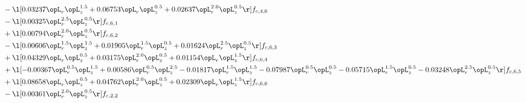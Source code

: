 \begin{alignat}{2}
& - \l[  0.03237 \opL_r \opL_z^{1.5} +  0.06753 \opL_r \opL_z^{0.5} +  0.02637 \opL_r^{2.0} \opL_z^{0.5}  \r] f_{c,4,6} \nonumber \\ 
& - \l[  0.00325 \opL_r^{2.5} \opL_z^{0.5}  \r] f_{c,6,1} \nonumber \\ 
& + \l[  0.00794 \opL_r^{2.0} \opL_z^{0.5}  \r] f_{c,6,2} \nonumber \\ 
& - \l[  0.00606 \opL_r^{1.5} \opL_z^{1.5} +  0.01905 \opL_r^{1.5} \opL_z^{0.5} +  0.01624 \opL_r^{2.5} \opL_z^{0.5}  \r] f_{c,6,3} \nonumber \\ 
& + \l[  0.04329 \opL_r \opL_z^{0.5} +  0.03175 \opL_r^{2.0} \opL_z^{0.5} +  0.01154 \opL_r \opL_z^{1.5}  \r] f_{c,6,4} \nonumber \\ 
& + \l[  -0.00367 \opL_r^{0.5} \opL_z^{1.5} +  0.00586 \opL_r^{0.5} \opL_z^{2.5}   -0.01817 \opL_r^{1.5} \opL_z^{1.5}   -0.07987 \opL_r^{0.5} \opL_z^{0.5}   -0.05715 \opL_r^{1.5} \opL_z^{0.5}   -0.03248 \opL_r^{2.5} \opL_z^{0.5}  \r] f_{c,6,5} \nonumber \\ 
& + \l[  0.08658 \opL_r \opL_z^{0.5} +  0.04762 \opL_r^{2.0} \opL_z^{0.5} +  0.02309 \opL_r \opL_z^{1.5}  \r] f_{c,6,6} \nonumber \\ 
& - \l[  0.00361 \opL_r^{2.0} \opL_z^{0.5}  \r] f_{c,2,2} \nonumber \\ 
\end{alignat} 


